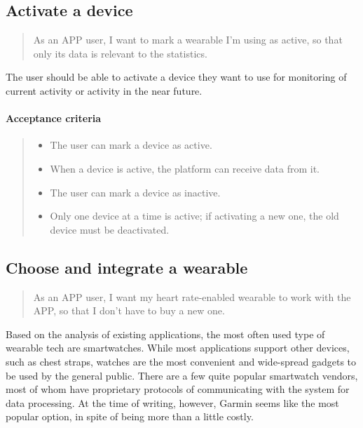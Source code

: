 \subsection{Activate a device}\label{US:HRM-device-activate}

\begin{quote}
As an APP user, I want to mark a wearable I'm using as active, so that only its data is relevant to the statistics.
\end{quote}

The user should be able to activate a device they want to use for monitoring of current activity or activity in the near future.

\paragraph*{Acceptance criteria}
\begin{quote}
\begin{itemize}
    \item The user can mark a device as active.
    \item When a device is active, the platform can receive data from it.
    \item The user can mark a device as inactive.
    \item Only one device at a time is active; if activating a new one, the old device must be deactivated.
\end{itemize}    
\end{quote}

\subsection{Choose and integrate a wearable}\label{US:HRM-device-integrate}
\begin{quote}
As an APP user, I want my heart rate-enabled wearable to work with the APP, so that I don't have to buy a new one.
\end{quote}

Based on the analysis of existing applications, the most often used type of wearable tech are smartwatches.
While most applications support other devices, such as chest straps, watches are the most convenient and wide-spread gadgets to be used by the general public.
There are a few quite popular smartwatch vendors, most of whom have proprietary protocols of communicating with the system for data processing.
At the time of writing, however, Garmin seems like the most popular option, in spite of being more than a little costly.


